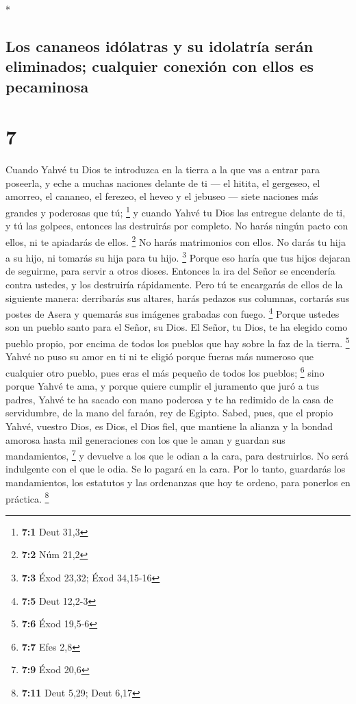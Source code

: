 \begin{paracol}{2}
\begin{otherlanguage}{english}
\end{otherlanguage}

\switchcolumn[0]*

\hypertarget{los-cananeos-iduxf3latras-y-su-idolatruxeda-seruxe1n-eliminados-cualquier-conexiuxf3n-con-ellos-es-pecaminosa}{%
\subsection{Los cananeos idólatras y su idolatría serán eliminados;
cualquier conexión con ellos es
pecaminosa}\label{los-cananeos-iduxf3latras-y-su-idolatruxeda-seruxe1n-eliminados-cualquier-conexiuxf3n-con-ellos-es-pecaminosa}}

\hypertarget{section-12}{%
\section{7}\label{section-12}}

 Cuando Yahvé tu Dios te introduzca en la tierra a la que
vas a entrar para poseerla, y eche a muchas naciones delante de ti ---
el hitita, el gergeseo, el amorreo, el cananeo, el ferezeo, el heveo y
el jebuseo --- siete naciones más grandes y poderosas que tú;
\footnote{\textbf{7:1} Deut 31,3}  y cuando Yahvé tu Dios
las entregue delante de ti, y tú las golpees, entonces las destruirás
por completo. No harás ningún pacto con ellos, ni te apiadarás de ellos.
\footnote{\textbf{7:2} Núm 21,2}  No harás matrimonios con
ellos. No darás tu hija a su hijo, ni tomarás su hija para tu hijo.
\footnote{\textbf{7:3} Éxod 23,32; Éxod 34,15-16}  Porque
eso haría que tus hijos dejaran de seguirme, para servir a otros dioses.
Entonces la ira del Señor se encendería contra ustedes, y los destruiría
rápidamente.  Pero tú te encargarás de ellos de la
siguiente manera: derribarás sus altares, harás pedazos sus columnas,
cortarás sus postes de Asera y quemarás sus imágenes grabadas con fuego.
\footnote{\textbf{7:5} Deut 12,2-3}  Porque ustedes son un
pueblo santo para el Señor, su Dios. El Señor, tu Dios, te ha elegido
como pueblo propio, por encima de todos los pueblos que hay sobre la faz
de la tierra. \footnote{\textbf{7:6} Éxod 19,5-6}  Yahvé
no puso su amor en ti ni te eligió porque fueras más numeroso que
cualquier otro pueblo, pues eras el más pequeño de todos los pueblos;
\footnote{\textbf{7:7} Efes 2,8}  sino porque Yahvé te
ama, y porque quiere cumplir el juramento que juró a tus padres, Yahvé
te ha sacado con mano poderosa y te ha redimido de la casa de
servidumbre, de la mano del faraón, rey de Egipto.  Sabed,
pues, que el propio Yahvé, vuestro Dios, es Dios, el Dios fiel, que
mantiene la alianza y la bondad amorosa hasta mil generaciones con los
que le aman y guardan sus mandamientos, \footnote{\textbf{7:9} Éxod 20,6}
 y devuelve a los que le odian a la cara, para
destruirlos. No será indulgente con el que le odia. Se lo pagará en la
cara.  Por lo tanto, guardarás los mandamientos, los
estatutos y las ordenanzas que hoy te ordeno, para ponerlos en práctica.
\footnote{\textbf{7:11} Deut 5,29; Deut 6,17}


\end{paracol}
